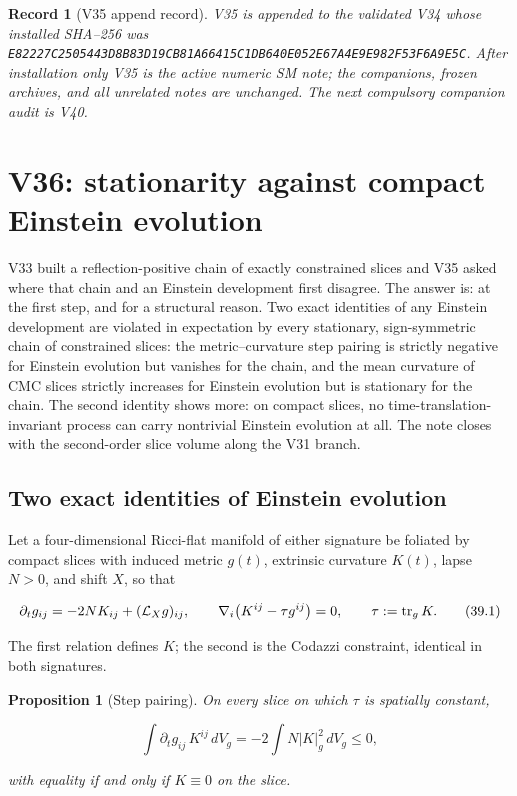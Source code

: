 \documentclass[11pt]{article}
\newtheorem{proposition}[theorem]{Proposition}
\newtheorem{record}[theorem]{Record}
\theoremstyle{remark}
\begin{document}
\begin{record}[V35 append record]
\label{rec:v19v35}
V35 is appended to the validated V34 whose installed SHA--256 was
\texttt{E82227C2505443D8B83D19CB81A66415C1DB640E052E67A4E9E982F53F6A9E5C}.
After installation only V35 is the active numeric SM note; the
companions, frozen archives, and all unrelated notes are unchanged.  The
next compulsory companion audit is V40.
\end{record}


\section{V36: stationarity against compact Einstein evolution}
\label{sec:v19v36}

V33 built a reflection-positive chain of exactly constrained slices and
V35 asked where that chain and an Einstein development first disagree.
The answer is: at the first step, and for a structural reason.  Two
exact identities of any Einstein development are violated in expectation
by every stationary, sign-symmetric chain of constrained slices: the
metric--curvature step pairing is strictly negative for Einstein
evolution but vanishes for the chain, and the mean curvature of CMC
slices strictly increases for Einstein evolution but is stationary for
the chain.  The second identity shows more: on compact slices, no
time-translation-invariant process can carry nontrivial Einstein
evolution at all.  The note closes with the second-order slice volume
along the V31 branch.

\subsection{Two exact identities of Einstein evolution}

Let a four-dimensional Ricci-flat manifold of either signature be
foliated by compact slices with induced metric \(g(t)\), extrinsic
curvature \(K(t)\), lapse \(N>0\), and shift \(X\), so that

\[
 \partial_tg_{ij}=-2NK_{ij}+({\cal L}_Xg)_{ij},
 \qquad
 \nabla_i\bigl(K^{ij}-\tau g^{ij}\bigr)=0,
 \qquad \tau:=\operatorname{tr}_gK.                              \tag{39.1}
\]

The first relation defines \(K\); the second is the Codazzi constraint,
identical in both signatures.

\begin{proposition}[Step pairing]
\label{prop:v19v36-pairing}
On every slice on which \(\tau\) is spatially constant,

\[
 \int\partial_tg_{ij}\,K^{ij}\,dV_g=-2\int N|K|_g^2\,dV_g\leq0,
                                                                    \tag{39.2}
\]

with equality if and only if \(K\equiv0\) on the slice.
\end{proposition}
\end{document}
